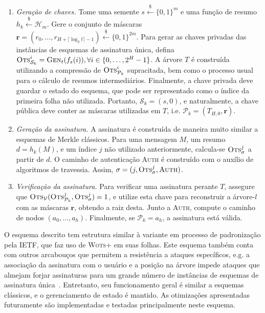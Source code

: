 \documentclass[12pt]{report}
\newcommand{\hh}{\mathcal{H}}
\newcommand{\pk}{\mathcal{P}_k}
\newcommand{\sk}{\mathcal{S}_k}
\newcommand{\binwds}[1]{\{0, 1\}^{#1}}
\begin{document}
\begin{enumerate}

  \item[] \emph{Geração de chaves.} Tome uma semente $s \stackrel{\$}{\longleftarrow} \binwds{m}$ e uma função de resumo $h_k \stackrel{\$}{\longleftarrow} \hh{}_m$. Gere o conjunto de máscaras $\mathbf{r} = (r_0, \dots, r_{H + \lceil \log_{2} t \rceil - 1}) \stackrel{\$}{\longleftarrow} \binwds{2m}$. Para gerar as chaves privadas das instâncias de esquemas de assinatura única, defina $\textsc{Ots}_{\sk{}}^{i} = \textsc{Gen}_t(f_s(i)), \forall i \in \{0, \dots, 2^H - 1\}$. A árvore $T$ é construída utilizando a compressão de $\textsc{Ots}_{\pk{}}^{i}$ supracitada, bem como o processo usual para o cálculo de resumos intermediários. Finalmente, a chave privada deve guardar o estado do esquema, que pode ser representado como o índice da primeira folha não utilizada. Portanto, $\sk{} = (s, 0)$, e naturalmente, a chave pública deve conter as máscaras utilizadas em $T$, i.e. $\pk{} = (T_{H,0}, \mathbf{r})$.
  
  \item[] \emph{Geração da assinatura.} A assinatura é construída de maneira muito similar a esquemas de Merkle clássicos. Para uma mensagem $M$, um resumo $d = h_k(M)$, e um índice $j$
  não utilizado anteriormente, calcula-se $\textsc{Ots}_\sigma^{j}$ a partir de $d$. O caminho de autenticação \textsc{Auth} é construído com o auxílio de algoritmos de travessia. Assim, $\sigma = (j, \textsc{Ots}_\sigma^{j}, \textsc{Auth})$.
  
  \item[] \emph{Verificação da assinatura.} Para verificar uma assinatura perante $T$, assegure que $\textsc{Ots}_{\mathcal{V}}(\textsc{Ots}_{\pk{}}^{j}, \textsc{Ots}_{\sigma}^{j}) = 1$, e utilize esta chave para reconstruir a árvore-$l$ com as máscaras $\mathbf{r}$, obtendo a raiz desta. Junto a \textsc{Auth}, compute o caminho de nodos $(a_0, \dots, a_h)$. Finalmente, se $\pk{} = a_{h}$, a assinatura está válida.

\end{enumerate}

O esquema descrito tem estrutura similar à variante em processo de padronização pela IETF, que faz uso de \textsc{Wots+} em suas folhas. Este esquema também conta com outros arcabouços que permitem a resistência a ataques específicos, e.g. a associação da assinatura com o usuário e a posição na árvore impede ataques que almejam forjar assinaturas para um grande número de instâncias de esquemas de assinatura única~\cite[9.1]{irtf-cfrg-xmss-hash-based-signatures-12}. Entretanto, seu funcionamento geral é similar a esquemas clássicos, e o gerenciamento de estado é mantido. As otimizações apresentadas futuramente são implementadas e testadas principalmente neste esquema. 
\end{document}
